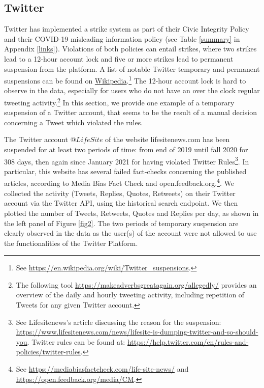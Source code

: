 \documentclass{article}
\begin{document}
\subsection{Twitter}

Twitter has implemented a strike system as part of their Civic Integrity Policy and their COVID-19 misleading information policy (see Table \ref{summary} in Appendix \ref{links}). Violations of both policies can entail strikes, where two strikes lead to a 12-hour account lock and five or more strikes lead to permanent suspension from the platform. A list of notable Twitter temporary and permanent suspensions can be found on  \href{https://en.wikipedia.org/wiki/Twitter_suspensions}{Wikipedia}.\footnote{See \href{https://en.wikipedia.org/wiki/Twitter\_suspensions}{https://en.wikipedia.org/wiki/Twitter\_suspensions}.}
The 12-hour account lock is hard to observe in the data, 
especially for users who do not have an over the clock regular tweeting activity.\footnote{The following tool \href{https://makeadverbsgreatagain.org/allegedly/}{https://makeadverbsgreatagain.org/allegedly/} provides an overview of the daily and hourly tweeting activity, including repetition of Tweets for any given Twitter account.} 
In this section, we provide one example of a temporary suspension of a Twitter account, that seems to be the result of a manual decision concerning a Tweet which violated the rules. 

The Twitter account $@LifeSite$ of the website lifesitenews.com has been suspended for at least two periods of time: from end of 2019 until fall 2020 for 308 days, then again since January 2021 for having violated Twitter Rules\footnote{See Lifesitenews's article discussing the reason for the suspension: \href{https://www.lifesitenews.com/news/lifesite-is-dumping-twitter-and-so-should-you}{https://www.lifesitenews.com/news/lifesite-is-dumping-twitter-and-so-should-you}. Twitter rules can be found at: \href{https://help.twitter.com/en/rules-and-policies/twitter-rules}{https://help.twitter.com/en/rules-and-policies/twitter-rules}. }. In particular, this website has several failed fact-checks concerning the published articles, according to Media Bias Fact Check and open.feedback.org.\footnote{See \href{https://mediabiasfactcheck.com/life-site-news/}{https://mediabiasfactcheck.com/life-site-news/} and \href{https://open.feedback.org/media/CM}{https://open.feedback.org/media/CM}.}. We collected the activity (Tweets, Replies, Quotes, Retweets) on their Twitter account via the Twitter API, using the historical search endpoint. We then plotted the number of Tweets, Retweets, Quotes and Replies per day, as shown in the left panel of Figure \ref{fig2}. The two periods of temporary suspension are clearly observed in the data as the user(s) of the account were not allowed to use the functionalities of the Twitter Platform. 
\end{document}
